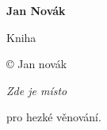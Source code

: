 \documentclass[11pt,a5paper]{book}
\begin{document}
\pagestyle{empty}

\begin{center}
	\vspace*{\fill}
	\Huge\bf
	Jan Novák

	Kniha
	\vspace{\fill}
\end{center}
\clearpage

\vspace*{\fill}
{ 
	\setlength\parindent{0pt}

	© Jan novák \the\year
}
\clearpage

\begin{flushright}
	\vspace*{\fill}
	\it
	Zde je místo

	pro hezké věnování.
	\par\vspace{\fill}
\end{flushright}
\cleardoublepage

{
	\tableofcontents
}
\thispagestyle{empty}

\pagestyle{plain}
% 


\thispagestyle{empty}
\end{document}
